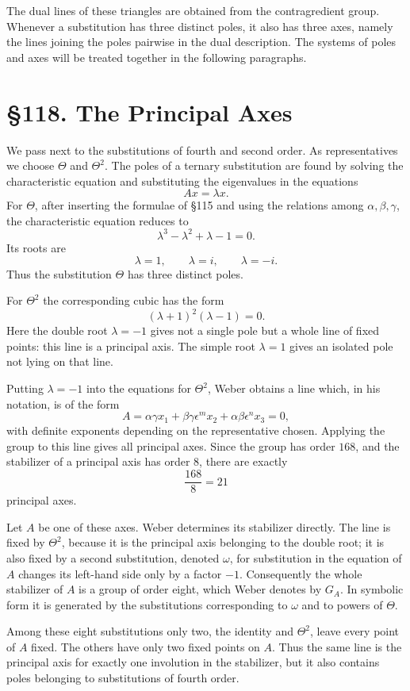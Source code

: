 \documentclass[11pt,a4paper]{book}
\newcommand{\webersection}[2]{\clearpage\section*{\S #1. #2}}
\begin{document}
The dual lines of these triangles are obtained from the contragredient group.  Whenever a substitution has three distinct poles, it also has three axes, namely the lines joining the poles pairwise in the dual description.  The systems of poles and axes will be treated together in the following paragraphs.

\webersection{118}{The Principal Axes}

We pass next to the substitutions of fourth and second order.  As representatives we choose \(\Theta\) and \(\Theta^2\).  The poles of a ternary substitution are found by solving the characteristic equation and substituting the eigenvalues in the equations
\[
 A x = \lambda x.
\]
For \(\Theta\), after inserting the formulae of \S 115 and using the relations among \(\alpha,\beta,\gamma\), the characteristic equation reduces to
\[
 \lambda^3-\lambda^2+\lambda-1=0.
\]
Its roots are
\[
 \lambda=1,
\qquad \lambda=i,
\qquad \lambda=-i.
\]
Thus the substitution \(\Theta\) has three distinct poles.

For \(\Theta^2\) the corresponding cubic has the form
\[
 (\lambda+1)^2(\lambda-1)=0.
\]
Here the double root \(\lambda=-1\) gives not a single pole but a whole line of fixed points: this line is a principal axis.  The simple root \(\lambda=1\) gives an isolated pole not lying on that line.

Putting \(\lambda=-1\) into the equations for \(\Theta^2\), Weber obtains a line which, in his notation, is of the form
\[
 A=\alpha\gamma x_1+\beta\gamma\epsilon^{m}x_2+
    \alpha\beta\epsilon^{n}x_3=0,
\]
with definite exponents depending on the representative chosen.  Applying the group to this line gives all principal axes.  Since the group has order \(168\), and the stabilizer of a principal axis has order \(8\), there are exactly
\[
 \frac{168}{8}=21
\]
principal axes.

Let \(A\) be one of these axes.  Weber determines its stabilizer directly.  The line is fixed by \(\Theta^2\), because it is the principal axis belonging to the double root; it is also fixed by a second substitution, denoted \(\omega\), for substitution in the equation of \(A\) changes its left-hand side only by a factor \(-1\).  Consequently the whole stabilizer of \(A\) is a group of order eight, which Weber denotes by \(G_A\).  In symbolic form it is generated by the substitutions corresponding to \(\omega\) and to powers of \(\Theta\).

Among these eight substitutions only two, the identity and \(\Theta^2\), leave every point of \(A\) fixed.  The others have only two fixed points on \(A\).  Thus the same line is the principal axis for exactly one involution in the stabilizer, but it also contains poles belonging to substitutions of fourth order.
\end{document}
